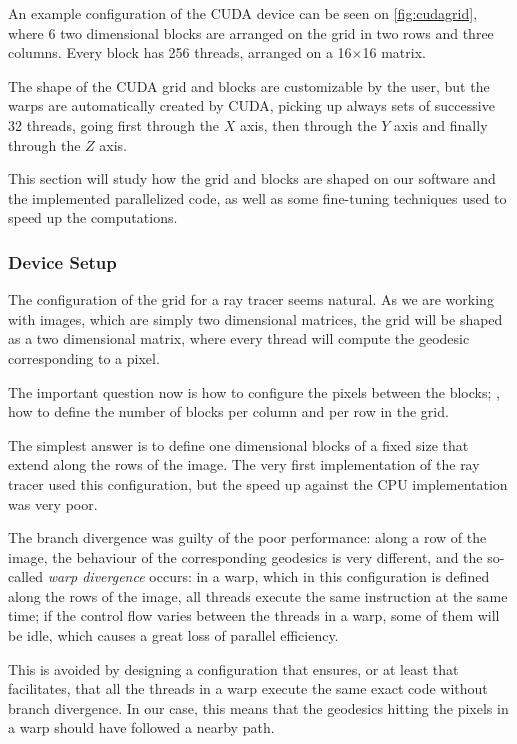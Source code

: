 An example configuration of the \ac{CUDA} device can be seen on \autoref{fig:cudagrid}, where 6 two dimensional blocks are arranged on the grid in two rows and three columns. Every block has 256 threads, arranged on a 16$\times$16 matrix.

The shape of the \ac{CUDA} grid and blocks are customizable by the user, but the warps are automatically created by \ac{CUDA}, picking up always sets of successive 32 threads, going first through the $X$ axis, then through the $Y$ axis and finally through the $Z$ axis.

This section will study how the grid and blocks are shaped on our software and the implemented parallelized code, as well as some fine-tuning techniques used to speed up the computations.

\subsubsection*{Device Setup}

The configuration of the grid for a ray tracer seems natural. As we are working with images, which are simply two dimensional matrices, the grid will be shaped as a two dimensional matrix, where every thread will compute the geodesic corresponding to a pixel.

The important question now is how to configure the pixels between the blocks; \ie, how to define the number of blocks per column and per row in the grid.

The simplest answer is to define one dimensional blocks of a fixed size that extend along the rows of the image. The very first implementation of the ray tracer used this configuration, but the speed up against the \ac{CPU} implementation was very poor.

The branch divergence was guilty of the poor performance: along a row of the image, the behaviour of the corresponding geodesics is very different, and the so-called \emph{warp divergence} occurs: in a warp, which in this configuration is defined along the rows of the image, all threads execute the same instruction at the same time; if the control flow varies between the threads in a warp, some of them will be idle, which causes a great loss of parallel efficiency.

This is avoided by designing a configuration that ensures, or at least that facilitates, that all the threads in a warp execute the same exact code without branch divergence. In our case, this means that the geodesics hitting the pixels in a warp should have followed a nearby path.

